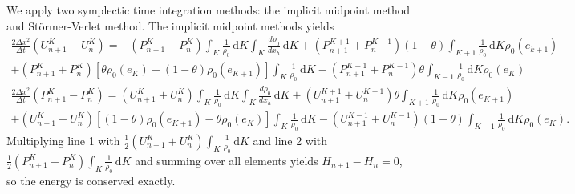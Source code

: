 \documentclass{article}
\begin{document}
We apply two symplectic time integration methods: the implicit midpoint method and St\"{o}rmer-Verlet method. The implicit midpoint methods yields
\begin{equation}
	\begin{aligned}
		\frac{2 \Delta x^2}{\Delta t} \left(U^K_{n+1}-U^K_n\right) = -(P^K_{n+1}+P^K_n)  \int_K \! \frac{1}{\rho_0} \, \mathrm{d}K   \int_K \! \frac{d \rho_0}{d x_h} \, \mathrm{d}K + (P^{K+1}_{n+1}+P^{K+1}_n) (1-\theta) \int_{K+1} \! \frac{1}{\rho_0} \, \mathrm{d}K \rho_0(e_{k+1}) \\
		+ (P^K_{n+1}+P^K_n) [\theta \rho_0(e_K) - (1-\theta) \rho_0(e_{K+1})] \int_K \! \frac{1}{\rho_0} \, \mathrm{d}K - (P^{K-1}_{n+1}+P^{K-1}_n) \theta \int_{K-1} \! \frac{1}{\rho_0} \, \mathrm{d}K \rho_0(e_K)\\
		\frac{2 \Delta x^2}{\Delta t} \left(P^K_{n+1}-P^K_n\right) = (U^K_{n+1}+U^K_n) \int_K \! \frac{1}{\rho_0} \, \mathrm{d}K   \int_K \! \frac{d \rho_0}{d x_h} \, \mathrm{d}K + (U^{K+1}_{n+1}+U^{K+1}_n) \theta \int_{K+1} \! \frac{1}{\rho_0} \, \mathrm{d}K \rho_0(e_{K+1}) \\
		+ (U^K_{n+1}+U^K_n) [(1-\theta) \rho_0(e_{K+1}) - \theta \rho_0(e_K)] \int_K \! \frac{1}{\rho_0} \, \mathrm{d}K - (U^{K-1}_{n+1}+U^{K-1}_n) (1-\theta) \int_{K-1} \! \frac{1}{\rho_0} \, \mathrm{d}K \rho_0(e_K).
	\end{aligned}
\end{equation}
Multiplying line 1 with $\frac{1}{2} (U_{n+1}^K + U_n^K) \int_K \! \frac{1}{\rho_0} \, \mathrm{d}K$ and line 2 with $\frac{1}{2} (P_{n+1}^K + P_n^K) \int_K \! \frac{1}{\rho_0} \, \mathrm{d}K$ and summing over all elements yields $H_{n+1}-H_n = 0$, so the energy is conserved exactly. 
\end{document}
